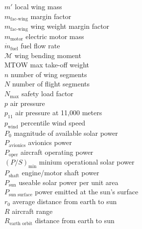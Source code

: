 \begin{multicols}{2}
\begin{tabbing}
$m'$ \> local wing mass \\ %
$m_{\text{fac-wing}}$ \> margin factor\\
$m_{\text{fac-wing}}$ \> wing weight margin factor \\
$m_{\text{motor}}$ \> electric motor mass \\
$\dot{m}_{\text{fuel}}$ \> fuel flow rate \\ %
$\mathcal{M}$ \> wing bending moment \\ %
MTOW \> max take-off weight \\ %
$n$ \> number of wing segments \\
$N$ \> number of flight segments \\
$N_{\text{max}}$ \> safety load factor\\
$p$ \> air pressure \\ %
$p_{11}$ \> air pressure at 11,000 meters \\ %
$p_{\text{wind}}$ \> percentile wind speed \\
$P_{0}$ \> magnitude of available solar power \\ %
$P_{\text{avionics}}$ \> avionics power \\ %
$P_{\text{oper}}$ \> aircraft operating power \\ %
$(P/S)_{\text{min}}$ \> minium operational solar power \\ %
$P_{\text{shaft}}$ \> engine/motor shaft power \\ %
$P_{\text{sun}}$ \> useable solar power per unit area \\ %
$P_{\text{sun surface}}$ \> power emitted at the sun's surface \\ %
$r_0$ \> average distance from earth to sun \\
$R$ \> aircraft range \\ %
$R_{\text{earth orbit}}$ \> distance from earth to sun \\

\end{tabbing}
\end{multicols}
